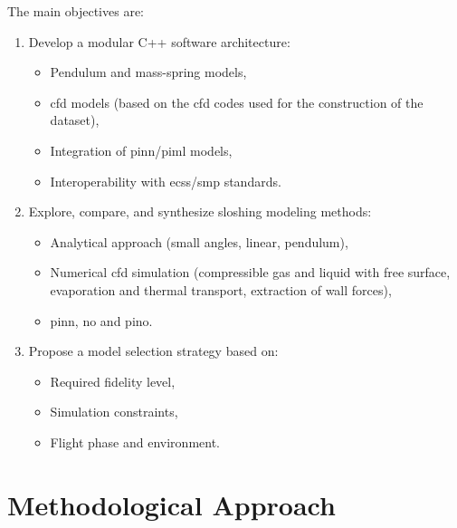 \documentclass[12pt]{article}
\begin{document}
	The main objectives are:
	\begin{enumerate}
		\item Develop a modular C++ software architecture:
		\begin{itemize}
			\item Pendulum and mass-spring models,
			\item \acrshort{cfd} models (based on the \acrshort{cfd} codes used for the construction of the dataset),
			\item Integration of \gls{pinn}/\acrshort{piml} models,
			\item Interoperability with \acrshort{ecss}/\acrshort{smp} standards.
		\end{itemize}
		\item Explore, compare, and synthesize sloshing modeling methods:
		\begin{itemize}
			\item Analytical approach (small angles, linear, pendulum),
			\item Numerical \acrshort{cfd} simulation (compressible gas and liquid with free surface, evaporation and thermal transport, extraction of wall forces),
			\item \acrfull{pinn}, \acrfull{no} and \acrfull{pino}.
		\end{itemize}
		\item Propose a model selection strategy based on:
		\begin{itemize}
			\item Required fidelity level,
			\item Simulation constraints,
			\item Flight phase and environment.
		\end{itemize}
	\end{enumerate}
	
	\section*{Methodological Approach}
	
\end{document}
